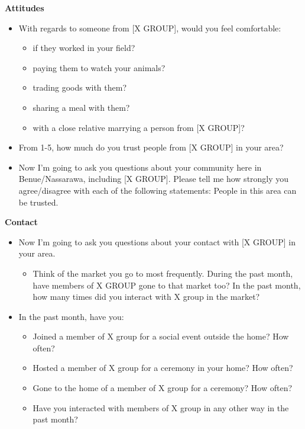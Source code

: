 \documentclass[
]{article}
\providecommand{\tightlist}{%
  \setlength{\itemsep}{0pt}\setlength{\parskip}{0pt}}
\begin{document}
\textbf{Attitudes}

\begin{itemize}
\tightlist
\item
  With regards to someone from {[}X GROUP{]}, would you feel
  comfortable:

  \begin{itemize}
  \tightlist
  \item
    if they worked in your field?
  \item
    paying them to watch your animals?
  \item
    trading goods with them?
  \item
    sharing a meal with them?
  \item
    with a close relative marrying a person from {[}X GROUP{]}?
  \end{itemize}
\item
  From 1-5, how much do you trust people from {[}X GROUP{]} in your
  area?
\item
  Now I'm going to ask you questions about your community here in
  Benue/Nassarawa, including {[}X GROUP{]}. Please tell me how strongly
  you agree/disagree with each of the following statements: People in
  this area can be trusted.
\end{itemize}

\textbf{Contact}

\begin{itemize}
\tightlist
\item
  Now I'm going to ask you questions about your contact with {[}X
  GROUP{]} in your area.

  \begin{itemize}
  \tightlist
  \item
    Think of the market you go to most frequently. During the past
    month, have members of X GROUP gone to that market too? In the past
    month, how many times did you interact with X group in the market?
  \end{itemize}
\item
  In the past month, have you:

  \begin{itemize}
  \tightlist
  \item
    Joined a member of X group for a social event outside the home? How
    often?
  \item
    Hosted a member of X group for a ceremony in your home? How often?
  \item
    Gone to the home of a member of X group for a ceremony? How often?
  \item
    Have you interacted with members of X group in any other way in the
    past month?
  \end{itemize}
\end{itemize}
\end{document}
